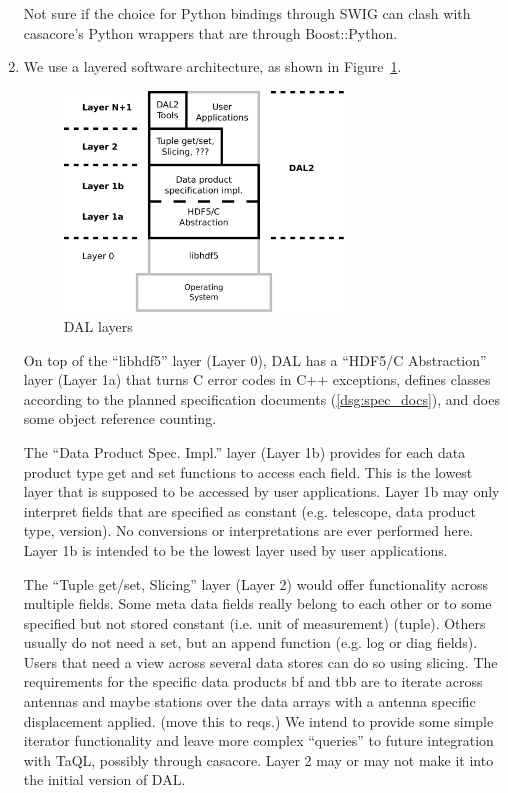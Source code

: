 \documentclass[a4paper,11pt]{article}
\begin{document}
\begin{enumerate}[label=\it D.\arabic{*}]
Not sure if the choice for Python bindings through SWIG can clash with casacore's Python wrappers that are through Boost::Python. %


\item \label{dsg:layers} We use a layered software architecture, as shown in Figure~\ref{fig:layers}.\\

\begin{figure}[htb!]
\centering
\includegraphics[width=0.70\textwidth]{Reqs_DD_layers.pdf}
\caption{DAL layers}
\label{fig:layers}	%
\end{figure}

On top of the ``libhdf5'' layer (Layer 0), DAL has a ``HDF5/C Abstraction'' layer (Layer 1a) that turns C error codes in C++ exceptions, defines classes according to the planned specification documents (\ref{dsg:spec_docs}), and does some object reference counting.

The ``Data Product Spec. Impl.'' layer (Layer 1b) provides for each data product type get and set functions to access each field.
This is the lowest layer that is supposed to be accessed by user applications.
Layer 1b may only interpret fields that are specified as constant (e.g. telescope, data product type, version).
No conversions or interpretations are ever performed here.
Layer 1b is intended to be the lowest layer used by user applications.

The ``Tuple get/set, Slicing'' layer (Layer 2) would offer functionality across multiple fields.
Some meta data fields really belong to each other or to some specified but not stored constant (i.e. unit of measurement) (tuple).
Others usually do not need a set, but an append function (e.g. log or diag fields).
Users that need a view across several data stores can do so using slicing.
The requirements for the specific data products bf and tbb are to iterate across antennas and maybe stations over the data arrays with a antenna specific displacement applied. (move this to reqs.)
We intend to provide some simple iterator functionality and leave more complex ``queries'' to future integration with TaQL, possibly through casacore.
Layer 2 may or may not make it into the initial version of DAL.


\end{enumerate}
\end{document}
